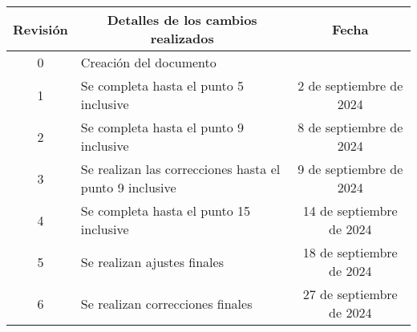 \begin{table}[ht]
	\label{tab:registro}
	\centering
	\begin{tabularx}{\linewidth}{@{}|c|X|c|@{}}
		\hline
		\rowcolor[HTML]{C0C0C0}
		Revisión & \multicolumn{1}{c|}{\cellcolor[HTML]{C0C0C0}Detalles de los cambios realizados} & Fecha                        \\ \hline
		0        & Creación del documento                                                          & \fechaInicioName             \\ \hline
		1        & Se completa hasta el punto 5 inclusive                                          & {2} de {septiembre} de 2024  \\ \hline
		2        & Se completa hasta el punto 9 inclusive                                          & {8} de {septiembre} de 2024  \\ \hline
		3        & Se realizan las correcciones hasta el punto 9 inclusive                         & {9} de {septiembre} de 2024  \\ \hline
		4        & Se completa hasta el punto 15 inclusive                                         & {14} de {septiembre} de 2024 \\ \hline
		5        & Se realizan ajustes finales                                                     & {18} de {septiembre} de 2024 \\ \hline
		6        & Se realizan correcciones finales                                                & {27} de {septiembre} de 2024 \\ \hline

	\end{tabularx}
\end{table}